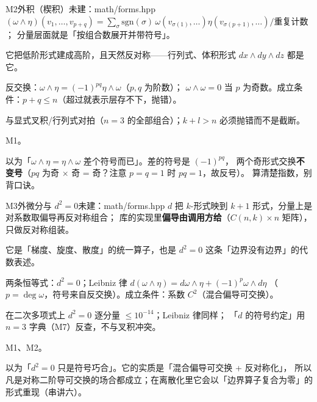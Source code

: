 \begin{know}{M2}{外积（楔积）}{未建：math/forms.hpp}
 $(\omega\wedge\eta)(v_1,\dots,v_{p+q})=\sum_\sigma\mathrm{sgn}(\sigma)\,
\omega(v_{\sigma(1)},\dots)\eta(v_{\sigma(p+1)},\dots)/\text{重复计数}$；
分量层面就是「按组合数展开并带符号」。

 它把低阶形式建成高阶，且天然反对称——行列式、体积形式 $dx\wedge dy\wedge dz$ 都是它。

 反交换：$\omega\wedge\eta=(-1)^{pq}\eta\wedge\omega$（$p,q$ 为阶数）；
$\omega\wedge\omega=0$ 当 $p$ 为奇数。成立条件：$p+q\le n$（超过就表示层存不下，抛错）。

 与显式叉积/行列式对拍（$n=3$ 的全部组合）；$k+l>n$ 必须抛错而不是截断。

 M1。

 以为「$\omega\wedge\eta=\eta\wedge\omega$ 差个符号而已」。差的符号是 $(-1)^{pq}$，
两个奇形式交换\textbf{不变号}（$pq$ 为奇 $\times$ 奇 = 奇？注意 $p=q=1$ 时 $pq=1$，故反号）。
算清楚指数，别背口诀。
\end{know}

\begin{know}{M3}{外微分与 $d^{2}=0$}{未建：math/forms.hpp}
 $d$ 把 $k$-形式映到 $k+1$ 形式，分量上是对系数取偏导再反对称组合；
库的实现里\textbf{偏导由调用方给}（$C(n,k)\times n$ 矩阵），只做反对称组装。

 它是「梯度、旋度、散度」的统一算子，也是 $d^{2}=0$ 这条「边界没有边界」的代数表述。

 两条恒等式：$d^{2}=0$；Leibniz 律 $d(\omega\wedge\eta)=d\omega\wedge\eta+(-1)^{p}\omega\wedge d\eta$
（$p=\deg\omega$，符号来自反交换）。成立条件：系数 $C^{2}$（混合偏导可交换）。

 在二次多项式上 $d^{2}=0$ 逐分量 $\le10^{-14}$；Leibniz 律同样；
「$d$ 的符号约定」用 $n=3$ 字典（M7）反查，不与叉积冲突。

 M1、M2。

 以为「$d^{2}=0$ 只是符号巧合」。它的实质是「混合偏导可交换 + 反对称化」，
所以凡是对称二阶导可交换的场合都成立；在离散化里它会以「边界算子复合为零」的形式重现（串讲六）。
\end{know}


